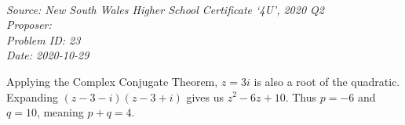 \SSbreak\\
\emph{Source: New South Wales Higher School Certificate `4U', 2020 Q2}\\
\emph{Proposer: \Pbrain}\\
\emph{Problem ID: 23}\\
\emph{Date: 2020-10-29}\\
\SSbreak

\bigskip

\begin{solution}\hfil\medskip
    
    Applying the Complex Conjugate Theorem, $z=3  i$ is also a root of the quadratic. Expanding $(z-3-i)(z-3+i)$ gives us $z^2-6z+10$. Thus $p = -6$ and $q = 10$, meaning $p + q = \boxed{4}$.
\end{solution}\bigskip